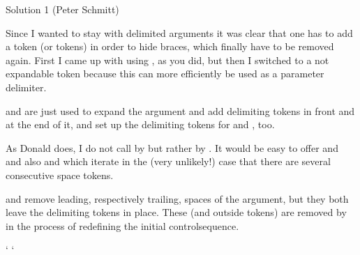 \begin{solution}{Solution 1 (Peter Schmitt)}

Since I wanted to stay with delimited arguments it was clear that one
has to add a token (or tokens) in order to hide braces, which finally
have to be removed again. First I came up with using \cmd{\empty}, as you
did, but then I switched to a not expandable token because this can
more efficiently be used as a parameter delimiter.

\cmd{\trimspaces} and \cmd{\trimspace} are just used to expand the argument and
add delimiting tokens in front and at the end of it, and set up the
delimiting tokens for \cmd{\Trimspace} and \cmd{\Trimspaces}, too.

As Donald does, I do not call \cmd{\trimspace} by \cmd{\trimspaces} but rather
\cmd{\Trimspace} by \cmd{\trimspaces}. It would be easy to offer \cmd{\TrimLeft}
\cmd{\TrimRight} and \cmd{\TrimBoth} and also \cmd{\TrimLeftS} \cmd{\TrimRightS} and
\cmd{\TrimBothS} which iterate in the (very unlikely!) case that there are
several consecutive space tokens.

\cmd{\Trimspaces} and \cmd{\Trimspace} remove leading, respectively trailing,
spaces of the argument, but they both leave the delimiting tokens in
place. These (and outside tokens) are removed by \cmd{\TrimSpace} in the
process of redefining the initial controlsequence.
\begin{lcode}
\catcode` \catcode`

\def\trimspace  #1{\expandafter\expandafter\expandafter
                   \Trimspace\expandafter <#1> >\\#1}
\def\trimspaces #1{\expandafter\expandafter\expandafter
                   \Trimspaces\expandafter <#1>< <\\#1}




\end{lcode}
\end{solution}
